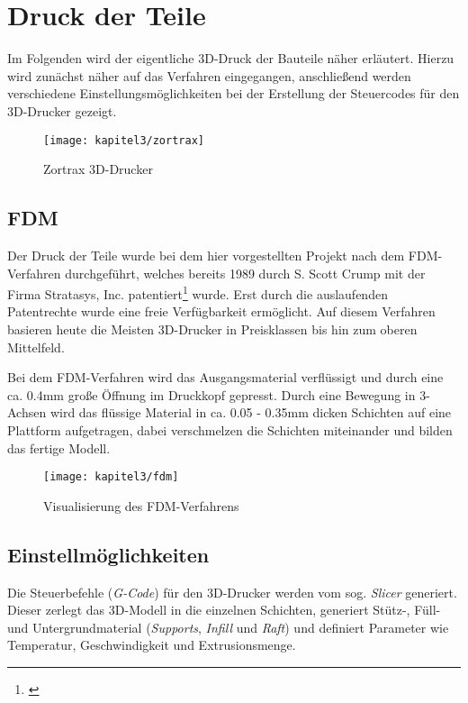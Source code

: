 \chapter{Druck der Teile}
Im Folgenden wird der eigentliche 3D-Druck der Bauteile näher erläutert. Hierzu wird zunächst näher auf das Verfahren eingegangen, anschließend werden verschiedene Einstellungsmöglichkeiten bei der Erstellung der Steuercodes für den 3D-Drucker gezeigt.

\begin{figure}[h]
  \centering
  \texttt{[image: kapitel3/zortrax]}
  \caption{Zortrax 3D-Drucker}
  \label{Kap3:Zortrax}
\end{figure}

\section{FDM}
Der Druck der Teile wurde bei dem hier vorgestellten Projekt nach dem \ac{FDM}-Verfahren durchgeführt, welches bereits 1989 durch S. Scott Crump mit der Firma Stratasys, Inc. patentiert\footnote{\cite{Crump1992}} wurde. Erst durch die auslaufenden Patentrechte wurde eine freie Verfügbarkeit ermöglicht. Auf diesem Verfahren basieren heute die Meisten 3D-Drucker in Preisklassen bis hin zum oberen Mittelfeld.

Bei dem \ac{FDM}-Verfahren wird das Ausgangsmaterial verflüssigt und durch eine ca. 0.4mm große Öffnung im Druckkopf gepresst. Durch eine Bewegung in 3-Achsen wird das flüssige Material in ca. 0.05 - 0.35mm dicken Schichten auf eine Plattform aufgetragen, dabei verschmelzen die Schichten miteinander und bilden das fertige Modell.

\begin{figure}[h]
  \centering
  \texttt{[image: kapitel3/fdm]}
  \caption{Visualisierung des FDM-Verfahrens}
  \label{Kap3:FDM}
\end{figure}

\section{Einstellmöglichkeiten}
Die Steuerbefehle (\textit{G-Code}) für den 3D-Drucker werden vom sog. \textit{Slicer} generiert. Dieser zerlegt das 3D-Modell in die einzelnen Schichten, generiert Stütz-, Füll- und Untergrundmaterial (\textit{Supports}, \textit{Infill} und \textit{Raft}) und definiert Parameter wie Temperatur, Geschwindigkeit und Extrusionsmenge.

